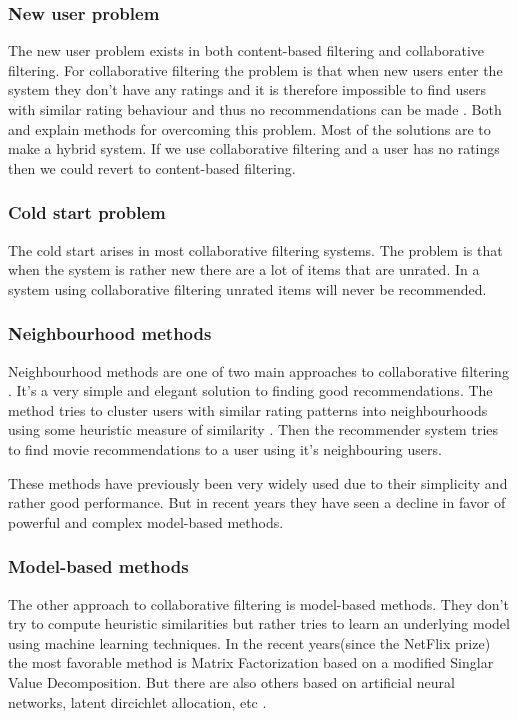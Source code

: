 \documentclass[a4paper,11pt]{article}
\begin{document}
\subsubsection{New user problem}
The new user problem exists in both content-based filtering and collaborative filtering. For collaborative filtering the problem is that when new users enter the system they don't have any ratings and it is therefore impossible to find users with similar rating behaviour and thus no recommendations can be made \cite{1423975}. Both \cite{1423975} and \cite{springerlink:10.1007/978-0-387-85820-3_1} explain methods for overcoming this problem. Most of the solutions are to make a hybrid system. If we use collaborative filtering and a user has no ratings then we could revert to content-based filtering.

\subsubsection{Cold start problem}
The cold start arises in most collaborative filtering systems. The problem is that when the system is rather new there are a lot of items that are unrated. In a system using collaborative filtering unrated items will never be recommended.

\subsubsection{Neighbourhood methods}
Neighbourhood methods are one of two main approaches to collaborative filtering \cite{factorin}.
It's a very simple and elegant solution to finding good recommendations. The method tries to cluster
users with similar rating patterns into neighbourhoods using some heuristic measure of similarity \cite{springerlink:10.1007/978-0-387-85820-3_1}.
Then the recommender system tries to find movie recommendations to a user using it's neighbouring users.

These methods have previously been very widely used due to their simplicity and rather good performance.
But in recent years they have seen a decline in favor of powerful and complex model-based methods.

\subsubsection{Model-based methods}
The other approach to collaborative filtering is model-based methods. They don't try to compute heuristic similarities
but rather tries to learn an underlying model using machine learning techniques. In the recent years(since the NetFlix prize)
the most favorable method is Matrix Factorization based on a modified Singlar Value Decomposition. But there are also others based on artificial neural networks, latent dircichlet allocation, etc \cite{factorin}\cite{springerlink:10.1007/978-0-387-85820-3_1}.
\end{document}
